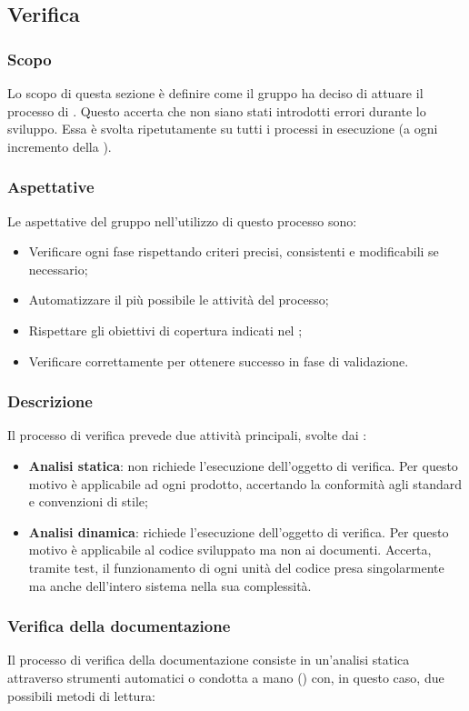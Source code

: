 \subsection{Verifica}
\subsubsection{Scopo}
Lo scopo di questa sezione è definire come il gruppo ha deciso di attuare il processo di . Questo accerta che non siano stati introdotti errori durante lo sviluppo. Essa è svolta ripetutamente su tutti i processi in esecuzione (a ogni incremento della ).

\subsubsection{Aspettative}
Le aspettative del gruppo \Gruppo{} nell'utilizzo di questo processo sono:
\begin{itemize}
	\item Verificare ogni fase rispettando criteri precisi, consistenti e modificabili se necessario;
	\item Automatizzare il più possibile le attività del processo;
	\item Rispettare gli obiettivi di copertura indicati nel \PdQ{};
	\item Verificare correttamente per ottenere successo in fase di validazione.
\end{itemize}

\subsubsection{Descrizione}
Il processo di verifica prevede due attività principali, svolte dai :
\begin{itemize}
	\item \textbf{Analisi statica}: non richiede l'esecuzione dell'oggetto di verifica. Per questo motivo è applicabile ad ogni prodotto, accertando la conformità agli standard e convenzioni di stile;
	\item \textbf{Analisi dinamica}: richiede l'esecuzione dell'oggetto di verifica. Per questo motivo è applicabile al codice sviluppato ma non ai documenti. Accerta, tramite test, il funzionamento di ogni unità del codice presa singolarmente ma anche dell'intero sistema nella sua complessità.
\end{itemize}

\subsubsection{Verifica della documentazione}
Il processo di verifica della documentazione consiste in un'analisi statica attraverso strumenti automatici o condotta a mano () con, in questo caso, due possibili metodi di lettura:   

